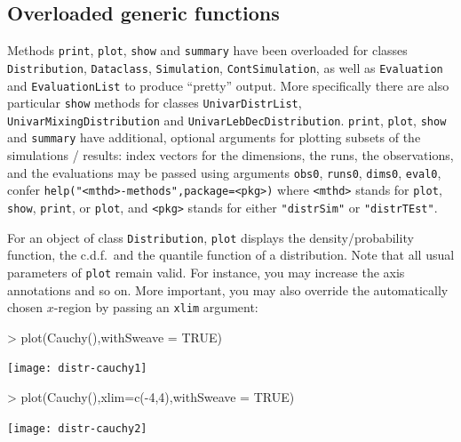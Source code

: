 \documentclass[11pt]{article}
\newcommand{\code}[1]{{\tt #1}}
\newcommand{\pkg}[1]{{\tt "#1"}}
\begin{document}
\subsection{Overloaded generic functions}
Methods \code{print}, \code{plot}, \code{show} and \code{summary} have been
overloaded for classes \code{Distribution}, \code{Dataclass}, \code{Simulation},
\code{ContSimulation}, as well as \code{Evaluation} and \code{EvaluationList} to
produce ``pretty''  output.
More specifically there are also particular \code{show} methods
for classes \code{UnivarDistrList}, \code{UnivarMixingDistribution} and
\code{UnivarLebDecDistribution}.
\code{print}, \code{plot}, \code{show} and \code{summary} have additional,
optional arguments for plotting subsets of the simulations / results:
index vectors for the dimensions, the runs, the observations, and the
evaluations may be passed using arguments \code{obs0},  \code{runs0},
\code{dims0}, \code{eval0}, confer
\code{help("<mthd>-methods",package=<pkg>)} where \code{<mthd>} stands for
\code{plot}, \code{show}, \code{print}, or \code{plot}, and \code{<pkg>} stands
for either \pkg{distrSim} or \pkg{distrTEst}.

For an object of class \code{Distribution},
\code{plot} displays the density/probability function, the c.d.f.\ and the
quantile function of a distribution. Note that all usual parameters of
\code{plot} remain valid. For instance, you may increase the axis annotations
and so on. More important, you may also
override the automatically chosen $x$-region by passing an \code{xlim} argument:
\begin{Schunk}
\begin{Sinput}
>   plot(Cauchy(),withSweave = TRUE)
\end{Sinput}
\end{Schunk}
\texttt{[image: distr-cauchy1]}
\begin{Schunk}
\begin{Sinput}
>   plot(Cauchy(),xlim=c(-4,4),withSweave = TRUE)
\end{Sinput}
\end{Schunk}
\texttt{[image: distr-cauchy2]}
\end{document}
